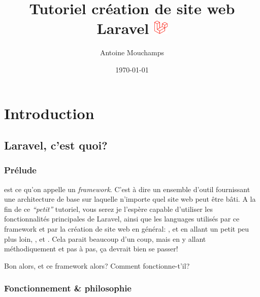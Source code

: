 \documentclass[internal]{nhitec_design}
\author{Antoine Mouchamps}
\date{\today}
\title{Tutoriel création de site web Laravel \includegraphics[height=20pt]{figures-logos/laravel.pdf}}
\begin{document}
\VerbatimFootnotes{}
\maketitle
\newpage
{
\hypersetup{linkcolor=black}
\color{red_nhitec}
\tableofcontents
}

\newpage

\section{Introduction}

\subsection{Laravel, c'est quoi?}

\subsubsection{Prélude}

\laravel{}{} est ce qu'on appelle un \textit{framework}. C'est à dire un ensemble d'outil fournissant une architecture de base sur laquelle n'importe quel site web peut être bâti. A la fin de ce \textit{``petit''} tutoriel, vous serez je l'espère capable d'utiliser les fonctionnalités principales de Laravel, ainsi que les languages utilisés par ce framework et par la création de site web en général: \php{}, \html{} et en allant un petit peu plus loin, \css{}, \jquery{}  et \js{}. Cela parait beaucoup d'un coup, mais en y allant méthodiquement et pas à pas, ça devrait bien se passer!

Bon alors, et ce framework alors? Comment fonctionne-t'il?

\subsubsection{Fonctionnement \& philosophie}\label{sec:fonctionnement&philosophie}
\end{document}
